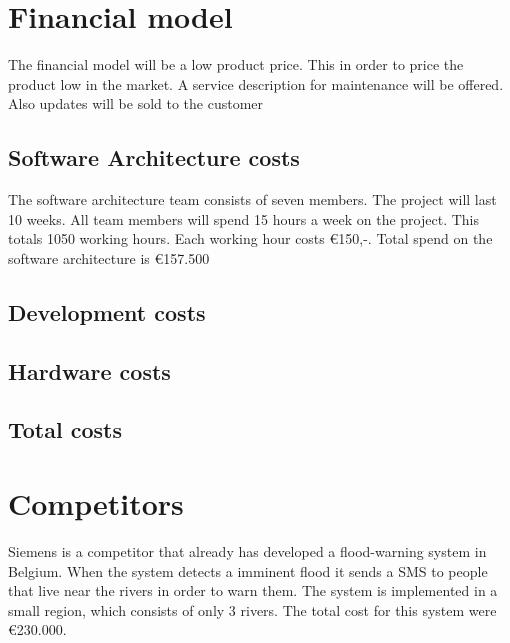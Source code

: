 \section{Financial model}
The financial model will be a low product price. This in order to price the product low in the market. A service description for maintenance will be offered. Also updates will be sold to the customer

\subsection{Software Architecture costs}
The software architecture team consists of seven members. The project will last 10 weeks. All team members will spend 15 hours a week on the project. This totals 1050 working hours. Each working hour costs \euro{}150,-. Total spend on the software architecture is \euro{}157.500
\subsection{Development costs}

\subsection{Hardware costs}

\subsection{Total costs}


\section{Competitors}
Siemens is a competitor that already has developed a flood-warning system in Belgium. When the system detects a imminent flood it sends a SMS to people that live near the rivers in order to warn them. The system is implemented in a small region, which consists of only 3 rivers. The total cost for this system were €230.000.

